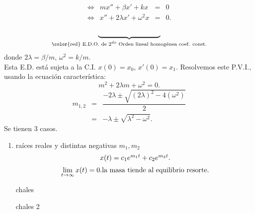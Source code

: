 \documentclass{beamer}
\begin{document}
\begin{frame}[t]
	\begin{block}{}
		\[
			\begin{array}{rrcl}
				\iff & mx'' + \beta x' + kx & = & 0 \\[2mm]
				\iff & x'' + 2 \lambda x' + \omega ^2x & = & 0.\\
			\end{array}
		\]
		\[
			\underbrace{\hphantom{x'' + 2 \lambda x' + \omega ^2x = 0}}_\text{\color{red} E.D.O. de \(2^{do}\) Orden lineal homogénea coef. const.} 
		\]
		donde \(2 \lambda = \beta /m\), \(\omega ^2 = k/m\). \\[2mm]
		Esta E.D. está sujeta a la C.I. \(x(0) = x_0\), \(x' (0) = x_1\).
		Resolvemos este P.V.I., usando la ecuación característica:
		\[
			m^2+2 \lambda m + \omega ^2 =0.
		\]
		\[
			\begin{array}{rcl}
				m_{1,2} & = & \dfrac{-2 \lambda \pm \sqrt{(2 \lambda) ^2 - 4(\omega ^2)}}{2}\\[2mm]
				& = & - \lambda \pm \sqrt{\lambda ^2- \omega ^2} .
			\end{array}
		\]
		Se tienen \(3\) casos.
	\end{block}
\end{frame}

\begin{frame}[t]
	\begin{block}{}
		\begin{enumerate}
			\item {} raíces reales y distintas negativas \(m_1,m_2\) 
				\[
					\begin{array}{c}
						x(t) = c_1e^{m_1t} + c_2e^{m_2t}. \\[2mm]
						\displaystyle\lim_{t\rightarrow \infty} x(t) =0. \mbox{la masa tiende al equilibrio resorte.}
					\end{array}
				\]
				\begin{minipage}{0.4\linewidth}
					chales
				\end{minipage}\hspace{5mm}
				\begin{minipage}{0.5\linewidth}
					chales 2
				\end{minipage}
		\end{enumerate}
	\end{block}
\end{frame}
\end{document}
